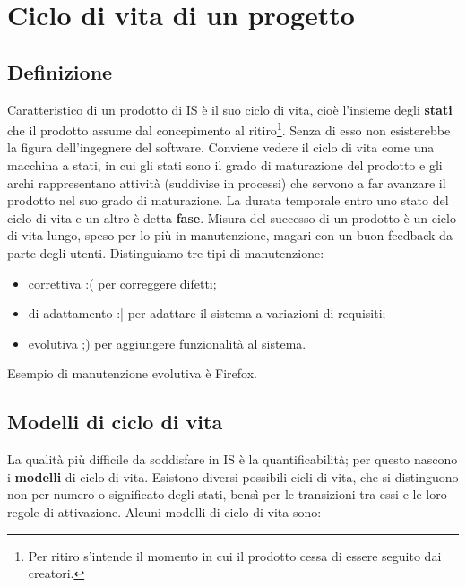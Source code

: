 \documentclass[a4paper]{article}
\begin{document}
	


		
	\section{Ciclo di vita di un progetto}


		
	\subsection{Definizione}

		
Caratteristico di un prodotto di IS è il suo ciclo di vita, cioè l'insieme degli \textbf{stati} che il prodotto assume dal concepimento al ritiro\footnote{Per ritiro s'intende il momento in cui il prodotto cessa di essere seguito dai creatori.}. Senza di esso non esisterebbe la figura dell'ingegnere del software. Conviene vedere il ciclo di vita come una macchina a stati, in cui gli stati sono il grado di maturazione del prodotto e gli archi rappresentano attività (suddivise in processi) che servono a far avanzare il prodotto nel suo grado di maturazione. La durata temporale entro uno stato del ciclo di vita e un altro è detta \textbf{fase}. Misura del successo di un prodotto è un ciclo di vita lungo, speso per lo più in manutenzione, magari con un buon feedback da parte degli utenti. Distinguiamo tre tipi di manutenzione:
		
	\begin{itemize}
		
			
	\item correttiva  :(  per correggere difetti;
			
	\item di adattamento  :|  per adattare il sistema a variazioni di requisiti;
			
	\item evolutiva  ;)  per aggiungere funzionalità al sistema.
		
	\end{itemize}

		
Esempio di manutenzione evolutiva è Firefox.

		
	\subsection{Modelli di ciclo di vita}

		La qualità più difficile da soddisfare in IS è la quantificabilità; per questo nascono i \textbf{modelli} di ciclo di vita. Esistono diversi possibili cicli di vita, che si distinguono non per numero o significato degli stati, bensì per le transizioni tra essi e le loro regole di attivazione. Alcuni modelli di ciclo di vita sono:
		
\end{document}
